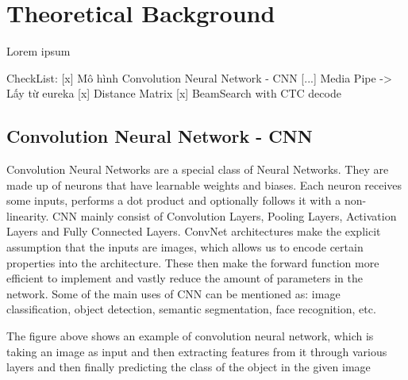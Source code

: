 \chapter{Theoretical Background}

Lorem ipsum

CheckList:
    [x] Mô hình Convolution Neural Network - CNN
    [...] Media Pipe -> Lấy từ eureka
    [x] Distance Matrix
    [x] BeamSearch with CTC decode

  \section{ Convolution Neural Network - CNN }
    Convolution Neural Networks are a special class of Neural Networks. They are made up 
    of neurons that have learnable weights and biases. Each neuron receives some inputs, 
    performs a dot product and optionally follows it with a non-linearity. CNN mainly consist
    of Convolution Layers, Pooling Layers, Activation Layers and Fully Connected Layers.
    ConvNet architectures make the explicit assumption that the inputs are images, 
    which allows us to encode certain properties into the architecture. These then 
    make the forward function more efficient to implement and vastly reduce the amount 
    of parameters in the network. Some of the main uses of CNN can be mentioned as: image
    classification, object detection, semantic segmentation, face recognition, etc.
    
    
      The figure above shows an example of convolution neural network, which is taking an image 
    as input and then extracting features from it through various layers and then finally predicting the
    class of the object in the given image

